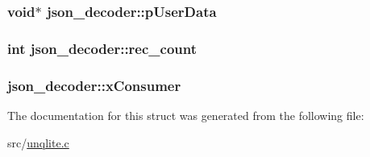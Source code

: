 \hypertarget{structjson__decoder_a5ff9bf9c85ccef00d58926a48c89b8b0}{
\subsubsection[{p\-User\-Data}]{\setlength{\rightskip}{0pt plus 5cm}void$\ast$ json\-\_\-decoder\-::p\-User\-Data}}\label{dd/d82/structjson__decoder_a5ff9bf9c85ccef00d58926a48c89b8b0}
\hypertarget{structjson__decoder_aa2218baa9735ff2110005cb272db3769}{
\subsubsection[{rec\-\_\-count}]{\setlength{\rightskip}{0pt plus 5cm}int json\-\_\-decoder\-::rec\-\_\-count}}\label{dd/d82/structjson__decoder_aa2218baa9735ff2110005cb272db3769}
\hypertarget{structjson__decoder_ad1a69c5f61827586c85b2a80b8ab6298}{
\subsubsection[{x\-Consumer}]{ json\-\_\-decoder\-::x\-Consumer}}\label{dd/d82/structjson__decoder_ad1a69c5f61827586c85b2a80b8ab6298}


The documentation for this struct was generated from the following file\-:\begin{DoxyCompactItemize}
\item 
src/\hyperlink{unqlite_8c}{unqlite.\-c}\end{DoxyCompactItemize}
